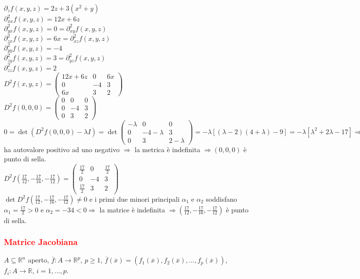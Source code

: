 \documentclass{article}
\newcommand{\R}{\mathbb{R}}
\begin{document}
$\partial_zf(x,y,z)=2z+3(x^2+y)$\\
$\partial_{xx}^2f(x,y,z)=12x+6z$\\
$\partial_{yx}^2f(x,y,z)=0=\partial_{xy}^2f(x,y,z)$\\
$\partial_{zx}^2f(x,y,z)=6x=\partial_{xz}^2f(x,y,z)$\\
$\partial_{yy}^2f(x,y,z)=-4$\\
$\partial_{zy}^2f(x,y,z)=3=\partial_{yz}^2f(x,y,z)$\\
$\partial_{zz}^2f(x,y,z)=2$\\
$D^2f(x,y,z)=\begin{pmatrix}
    12x+6z&0&6x\\
    0&-4&3\\
    6x&3&2
\end{pmatrix}$\\
$D^2f(0,0,0)=\begin{pmatrix}
    0&0&0\\
    0&-4&3\\
    0&3&2
\end{pmatrix}$\\
$0=\det(D^2f(0,0,0)-\lambda I)= \det \begin{pmatrix}
    -\lambda&0&0\\
    0&-4-\lambda&3\\
    0&3&2-\lambda
\end{pmatrix}=-\lambda[(\lambda-2)(4+\lambda)-9]=-\lambda[\lambda^2+2\lambda-17] \Rightarrow$ ha autovalore positivo ad uno negativo $\Rightarrow$ la metrica è indefinita $\Rightarrow (0,0,0)$ è punto di sella.\\
$D^2f(\frac{17}{12},-\frac{17}{16},-\frac{17}{12})=\begin{pmatrix}
    \frac{17}{2}&0&\frac{17}{2}\\
    0&-4&3\\
    \frac{17}{2}&3&2
\end{pmatrix}$\\
$\det D^2f(\frac{17}{12},-\frac{17}{16},-\frac{17}{12})\neq 0$ e i primi due minori principali $\alpha_1$ e $\alpha_2$ soddisfano $\alpha_1= \frac{17}{2} >0$ e $\alpha_2 =-34 <0 \Rightarrow$ la matrice è indefinita $\Rightarrow (\frac{17}{12},-\frac{17}{16},-\frac{17}{12})$ è punto di sella.

\subsubsection{\textcolor{red}{Matrice Jacobiana}}
$A \subseteq \R^n$ aperto, $\overline{f}: A \rightarrow \R^p$, $p \geq 1$, $\overline{f}(\overline{x})=(f_1(\overline{x}),f_2(\overline{x}),...,f_p(\overline{x}))$, $f_i:A \rightarrow \R$, $ i =1,...,p$.
\end{document}
